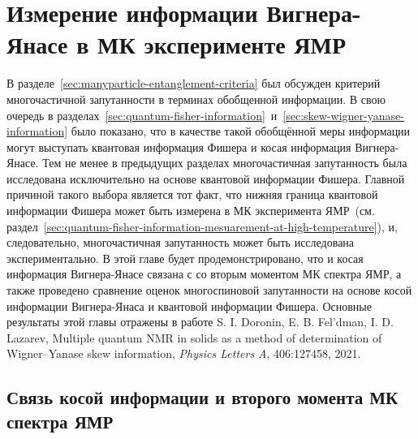 \chapter{Измерение информации Вигнера-Янасе в МК эксперименте ЯМР}
\label{chapter:wyi-mesuarement}


В разделе~\ref{sec:manyparticle-entanglement-criteria} был обсужден критерий многочастичной запутанности
в терминах обобщенной информации.
В свою очередь в разделах~\ref{sec:quantum-fisher-information}~и~\ref{sec:skew-wigner-yanase-information}
было показано,
что в качестве такой обобщённой меры информации могут выступать
квантовая информация Фишера и косая информация Вигнера-Янасе.
Тем не менее в предыдущих разделах многочастичная запутанность была исследована исключительно
на основе квантовой информации Фишера.
Главной причиной такого выбора является тот факт,
что нижняя граница квантовой информации Фишера может быть измерена в МК эксперимента ЯМР~(см.  раздел~\ref{sec:quantum-fisher-information-mesuarement-at-high-temperature}),
и, следовательно, многочастичная запутанность может быть исследована экспериментально.
В этой главе будет продемонстрировано,
что и косая информация Вигнера-Янасе связана с
со вторым моментом МК спектра ЯМР,
а также проведено сравнение оценок многоспиновой запутанности
на основе косой информации Вигнера-Янаса и квантовой информации Фишера. 
Основные результаты этой главы отражены в работе S. I. Doronin, E. B. Fel'dman,  I. D. Lazarev, Multiple quantum NMR in solids as a method of determination of Wigner–Yanase skew information, \textit{Physics Letters A}, 406:127458, 2021.



\section{Связь косой информации и второго момента МК спектра ЯМР}
\label{sec:wyi-mesuarement}

